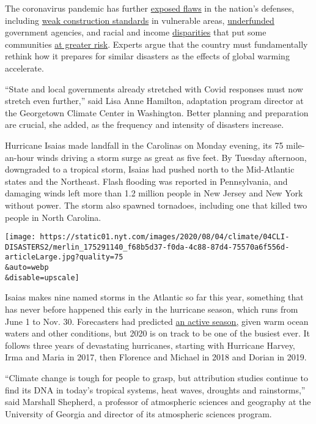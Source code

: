The coronavirus pandemic has further
\href{https://www.nytimes.com/2020/05/22/climate/fema-volunteer-disaster-response.html}{exposed
flaws} in the nation's defenses, including
\href{https://www.nytimes.com/2019/10/26/climate/building-codes-secret-deal.html}{weak
construction standards} in vulnerable areas,
\href{https://newrepublic.com/article/158486/towns-arent-equipped-handle-climate-emergencies}{underfunded}
government agencies, and racial and income
\href{https://www.nytimes.com/2020/05/17/climate/pollution-poverty-coronavirus.html}{disparities}
that put some communities
\href{https://www.nytimes.com/2020/07/24/climate/houston-flooding-race.html}{at
greater risk}. Experts argue that the country must fundamentally rethink
how it prepares for similar disasters as the effects of global warming
accelerate.

``State and local governments already stretched with Covid responses
must now stretch even further,'' said Lisa Anne Hamilton, adaptation
program director at the Georgetown Climate Center in Washington. Better
planning and preparation are crucial, she added, as the frequency and
intensity of disasters increase.

Hurricane Isaias made landfall in the Carolinas on Monday evening, its
75 mile-an-hour winds driving a storm surge as great as five feet. By
Tuesday afternoon, downgraded to a tropical storm, Isaias had pushed
north to the Mid-Atlantic states and the Northeast. Flash flooding was
reported in Pennsylvania, and damaging winds left more than 1.2 million
people in New Jersey and New York without power. The storm also spawned
tornadoes, including one that killed two people in North Carolina.

\texttt{[image: https://static01.nyt.com/images/2020/08/04/climate/04CLI-DISASTERS2/merlin\_175291140\_f68b5d37-f0da-4c88-87d4-75570a6f556d-articleLarge.jpg?quality=75\\\&auto=webp\\\&disable=upscale]}

Isaias makes nine named storms in the Atlantic so far this year,
something that has never before happened this early in the hurricane
season, which runs from June 1 to Nov. 30. Forecasters had predicted
\href{https://www.nytimes.com/2020/05/21/climate/hurricane-season-2020-noaa.html}{an
active season,} given warm ocean waters and other conditions, but 2020
is on track to be one of the busiest ever. It follows three years of
devastating hurricanes, starting with Hurricane Harvey, Irma and Maria
in 2017, then Florence and Michael in 2018 and Dorian in 2019.

``Climate change is tough for people to grasp, but attribution studies
continue to find its DNA in today's tropical systems, heat waves,
droughts and rainstorms,'' said Marshall Shepherd, a professor of
atmospheric sciences and geography at the University of Georgia and
director of its atmospheric sciences program.

